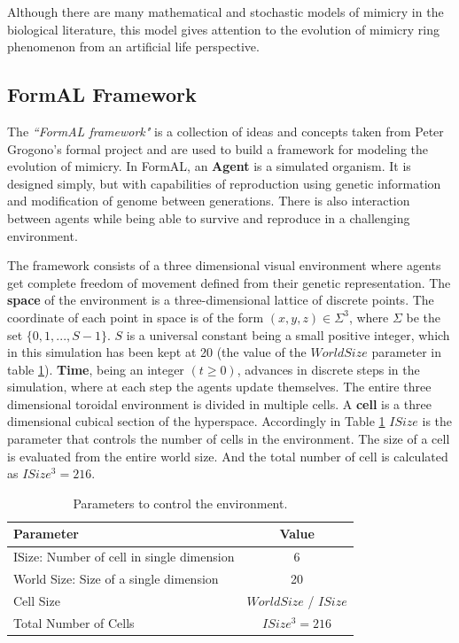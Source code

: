 \documentclass[letterpaper]{article}
\numberwithin{equation}{section}
\begin{document}
Although there are many mathematical and stochastic models of mimicry in the biological literature, this model gives attention to the evolution of mimicry ring phenomenon from an artificial life perspective.

\subsection{FormAL Framework}
The \textsl{``FormAL framework"} is a collection of ideas and concepts taken from Peter Grogono's \gls{formal} project \citep{grogono2003} and are used to build a framework for modeling the evolution of mimicry. In FormAL, an \textbf{Agent} is a simulated organism. It is designed simply, but with capabilities of reproduction using genetic information and modification of genome between generations. There is also interaction between agents while being able to survive and reproduce in a challenging environment. 

The framework consists of a three dimensional visual environment where agents get complete freedom of movement defined from their genetic representation. The \textbf{space} of the environment is a three-dimensional lattice of discrete points. The coordinate of each point in space is of the form \((x,y,z) \in \Sigma^3\), where \(\Sigma\) be the set \(\{0, 1, ..., S-1\}\). \(S\) is a universal constant being a small positive integer, which in this simulation has been kept at 20 (the value of the \(World Size\) parameter in table \ref{tab:environment-control-parameters}). \textbf{Time}, being an integer \( (t \geq 0) \), advances in discrete steps in the simulation, where at each step the agents update themselves. The entire three dimensional toroidal environment is divided in multiple cells. A \textbf{cell} is a three dimensional cubical section of the hyperspace. Accordingly in Table \ref{tab:environment-control-parameters} \(ISize\) is the parameter that controls the number of cells in the environment. The size of a cell is evaluated from the entire world size. And the total number of cell is calculated as \(ISize^3 = 216\).

\begin{table}[h]
\small
\centering
\begin{tabular}{| l | c |}
	\hline
		\textbf{Parameter} & \textbf{Value} \\ \hline
		ISize: Number of cell in single dimension & 6 \\ \hline
		World Size: Size of a single dimension & 20 \\ \hline
		Cell Size & \( World Size\) / \(ISize \) \\ \hline
		Total Number of Cells & \( ISize^3  = 216\)\\ 
	\hline
\end{tabular}
\caption{Parameters to control the environment.}
\label{tab:environment-control-parameters}
\end{table}
\end{document}
